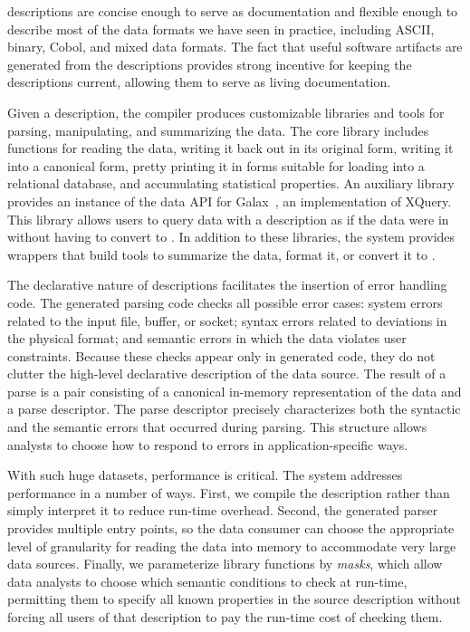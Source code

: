 \documentclass[11pt]{article}
\begin{document}
\pads{} descriptions are concise enough to
serve as documentation and flexible enough to describe most of
the data formats we have seen in practice, including ASCII, binary,
Cobol, and mixed data formats.  The fact that useful software
artifacts are generated from the descriptions provides strong
incentive for keeping the descriptions current, allowing them to serve
as living documentation.  

Given a \pads{} description, the \pads{} compiler produces customizable \C{} libraries
and tools for parsing, manipulating, and summarizing the data. 
The core \C{} library includes functions for reading the data, writing it 
back out in its original form, writing it into a canonical \xml{} form, pretty printing
it in forms suitable for loading into a relational database, and accumulating  
statistical properties.  An auxiliary library provides 
an instance of the data API for Galax~\cite{galax,galaxmanual}, an implementation of XQuery.  This 
library allows users to query data with a \pads{} description as if the data were
in \xml{} without having to convert to \xml{}.  In addition to these libraries,
the \pads{} system provides wrappers that build tools to 
summarize the data, format it,  or convert it to \xml{}.

The declarative nature of \pads{} descriptions facilitates the
insertion of error handling code.
The generated parsing code checks all possible error cases: system
errors related to the input file, buffer, or socket; syntax errors
related to deviations in the physical format; and semantic errors in
which the data violates user constraints.  Because these checks appear
only in generated code, they do not clutter the high-level declarative
description of the data source.
The result of a parse is a pair consisting of a canonical in-memory
representation of the data and a parse descriptor. The parse
descriptor precisely characterizes both the syntactic and the semantic
errors that occurred during parsing.  This structure allows analysts
to choose how to respond to errors in application-specific ways.  

With such huge datasets, performance is critical. The \pads{} system addresses performance in a number of ways.
First, we compile the \pads{} description rather than simply interpret it to reduce run-time overhead.
Second, the generated parser provides  multiple entry points, so the data consumer can choose 
the appropriate level of granularity for reading the data into memory to accommodate very large data sources.
Finally, we parameterize library functions by \textit{masks}, which allow data analysts to 
choose which semantic conditions to check at run-time, permitting them to specify
all known properties in the source description without forcing all users of that 
description to pay the run-time cost of checking them.  
\end{document}

